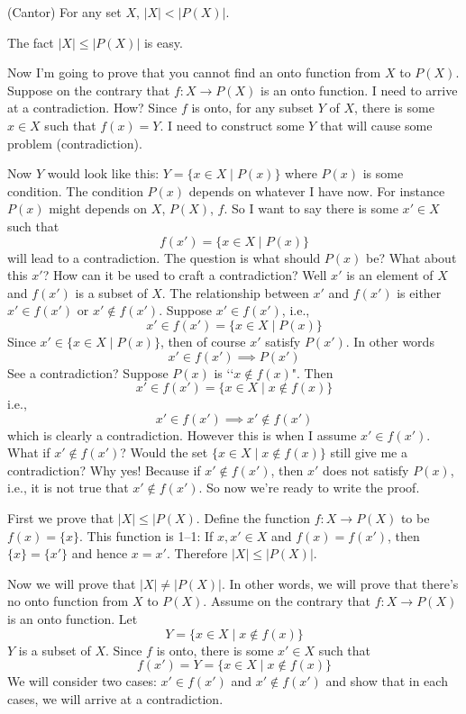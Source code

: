 \begin{thm} \textnormal{(Cantor)}
For any set $X$, $|X| < |P(X)|$.
\end{thm}

The fact $|X| \leq |P(X)|$ is easy.

Now I'm going to prove that you cannot find an onto function
from $X$ to $P(X)$.
Suppose on the contrary that 
$f : X \rightarrow P(X)$ is an onto function.
I need to arrive at a contradiction.
How?
Since $f$ is onto,
for any subset $Y$ of $X$, there is some $x \in X$ such that
$f(x) = Y$.
I need to construct some $Y$ that will cause some problem (contradiction).

Now $Y$ would look like this:
$Y = \{x \in X \mid P(x)\}$ where $P(x)$ is some condition.
The condition $P(x)$ depends on whatever I have now.
For instance $P(x)$ might depends on $X$, $P(X)$, $f$.
So I want
to say there is some $x' \in X$ such that 
\[
f(x') = \{x \in X \mid P(x) \}
\]
will lead to a contradiction.
The question is what should $P(x)$ be?
What about this $x'$?
How can it be used to craft a contradiction?
Well $x'$ is an element of $X$
and $f(x')$ is a subset of $X$.
The relationship between $x'$ and $f(x')$ is
either $x' \in f(x')$ or $x' \not\in f(x')$.
Suppose $x' \in f(x')$, i.e.,
\[
x' \in f(x') = \{x \in X \mid P(x) \}
\]
Since $x' \in \{x \in X \mid P(x) \}$, then of course $x'$
satisfy $P(x')$.
In other words
\[
x' \in f(x') \implies P(x')
\]
See a contradiction? Suppose $P(x)$ is \lq\lq$x \not\in f(x)$".
Then
\[
x' \in f(x') = \{x \in X \mid x \not\in f(x) \}
\]
i.e.,
\[
x' \in f(x') \implies x' \not\in f(x')
\]
which is clearly a contradiction.
However this is when I assume $x' \in f(x')$.
What if $x' \not\in f(x')$?
Would the set 
$\{x \in X \mid x \not\in f(x) \}$ still give me a contradiction?
Why yes!
Because if $x' \not\in f(x')$, then $x'$ does not
satisfy $P(x)$, i.e., it is not true that
$x' \not\in f(x')$.
So now we're ready to write the proof.

\proof
First we prove that $|X| \leq |P(X)$.
Define the function $f: X \rightarrow P(X)$ to be
$f(x) = \{x\}$.
This function is 1--1:
If $x,x' \in X$ and $f(x) = f(x')$, then $\{x\} = \{x'\}$
and hence $x = x'$.
Therefore $|X| \leq |P(X)|$.

Now we will prove that $|X| \neq |P(X)|$.
In other words, we will prove that there's no onto function
from $X$ to $P(X)$.
Assume on the contrary that $f: X \rightarrow P(X)$ is an onto function.
Let
\[
Y = \{x \in X \mid x \not\in f(x) \}
\]
$Y$ is a subset of $X$.
Since $f$ is onto, there is some $x' \in X$ such that
\[
f(x') = Y = \{x \in X \mid x \not\in f(x) \}
\]
We will consider two cases: $x' \in f(x')$ and $x' \not\in f(x')$
and show that in each cases, we will arrive at a contradiction.

